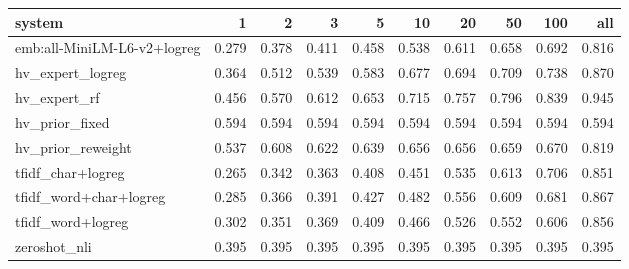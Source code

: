 \begin{tabular}{lrrrrrrrrr}
\toprule
system & 1 & 2 & 3 & 5 & 10 & 20 & 50 & 100 & all \\
\midrule
emb:all-MiniLM-L6-v2+logreg & 0.279 & 0.378 & 0.411 & 0.458 & 0.538 & 0.611 & 0.658 & 0.692 & 0.816 \\
hv\_expert\_logreg & 0.364 & 0.512 & 0.539 & 0.583 & 0.677 & 0.694 & 0.709 & 0.738 & 0.870 \\
hv\_expert\_rf & 0.456 & 0.570 & 0.612 & 0.653 & 0.715 & 0.757 & 0.796 & 0.839 & 0.945 \\
hv\_prior\_fixed & 0.594 & 0.594 & 0.594 & 0.594 & 0.594 & 0.594 & 0.594 & 0.594 & 0.594 \\
hv\_prior\_reweight & 0.537 & 0.608 & 0.622 & 0.639 & 0.656 & 0.656 & 0.659 & 0.670 & 0.819 \\
tfidf\_char+logreg & 0.265 & 0.342 & 0.363 & 0.408 & 0.451 & 0.535 & 0.613 & 0.706 & 0.851 \\
tfidf\_word+char+logreg & 0.285 & 0.366 & 0.391 & 0.427 & 0.482 & 0.556 & 0.609 & 0.681 & 0.867 \\
tfidf\_word+logreg & 0.302 & 0.351 & 0.369 & 0.409 & 0.466 & 0.526 & 0.552 & 0.606 & 0.856 \\
zeroshot\_nli & 0.395 & 0.395 & 0.395 & 0.395 & 0.395 & 0.395 & 0.395 & 0.395 & 0.395 \\
\bottomrule
\end{tabular}
